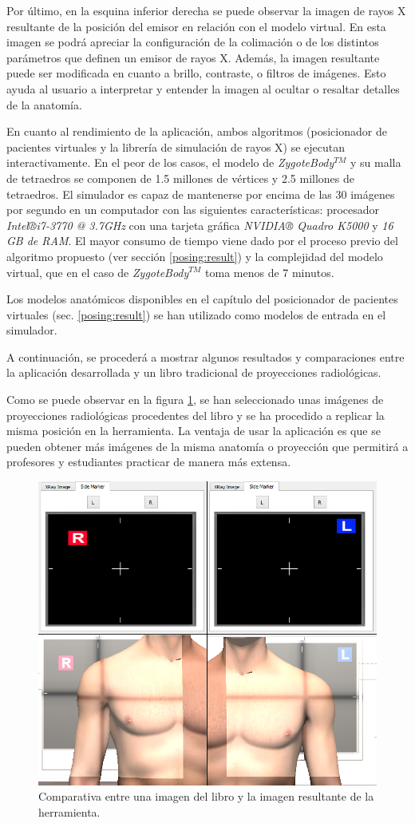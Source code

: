 Por último, en la esquina inferior derecha se puede observar la imagen de rayos X resultante de la posición del emisor en relación con el modelo virtual. En esta imagen se podrá apreciar la configuración de la colimación o de los distintos parámetros que definen un emisor de rayos X. Además, la imagen resultante puede ser modificada en cuanto a brillo, contraste, o filtros de imágenes. Esto ayuda al usuario a interpretar y entender la imagen al ocultar o resaltar detalles de la anatomía.

En cuanto al rendimiento de la aplicación, ambos algoritmos (posicionador de pacientes virtuales y la librería de simulación de rayos X) se ejecutan interactivamente. En el peor de los casos, el modelo de \emph{ZygoteBody}$^{TM}$ y su malla de tetraedros se componen de 1.5 millones de vértices y 2.5 millones de tetraedros. El simulador es capaz de mantenerse por encima de las 30 imágenes por segundo en un computador con las siguientes características: procesador \emph{Intel®i7-3770 @ 3.7GHz} con una tarjeta gráfica \emph{NVIDIA® Quadro K5000} y \emph{16 GB de \ac{RAM}}. 
El mayor consumo de tiempo viene dado por el proceso previo del algoritmo propuesto (ver sección \ref{posing:result}) y la complejidad del modelo virtual, que en el caso de \emph{ZygoteBody}$^{TM}$ toma menos de 7 minutos.

Los modelos anatómicos disponibles en el capítulo del posicionador de pacientes virtuales (sec. \ref{posing:result}) se han utilizado como modelos de entrada en el simulador. 

A continuación, se procederá a mostrar algunos resultados y comparaciones entre la aplicación desarrollada y un libro tradicional de proyecciones radiológicas.

Como se puede observar en la figura \ref{fig:xraycomp}, se han seleccionado unas imágenes de proyecciones radiológicas procedentes del libro \cite{carver2012medical} y se ha procedido a replicar la misma posición en la herramienta. La ventaja de usar la aplicación es que se pueden obtener más imágenes de la misma anatomía o proyección que permitirá a profesores y estudiantes practicar de manera más extensa. 


\begin{figure}[tb]
\centering
\includegraphics[width=0.5\linewidth]{IMG/side.png}
\caption{\label{fig:xraycomp} Comparativa entre una imagen del libro\cite{carver2012medical} y la imagen resultante de la herramienta. }
\end{figure}

